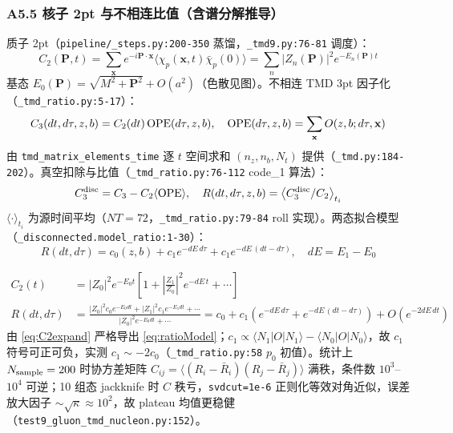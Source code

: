 \documentclass[UTF8]{ctexart}
\begin{document}
\subsubsection{A5.5 核子 2pt 与不相连比值（含谱分解推导）}
质子 2pt（\texttt{\nolinkurl{pipeline/\_steps.py:200-350}} 蒸馏，\texttt{\nolinkurl{\_tmd9.py:76-81}} 调度）：
\begin{equation}
C_2(\mathbf{P},t)=\sum_{\mathbf{x}}e^{-i\mathbf{P}\cdot\mathbf{x}}\langle\chi_p(\mathbf{x},t)\bar\chi_p(0)\rangle = \sum_n |Z_n(\mathbf{P})|^2 e^{-E_n(\mathbf{P})t}
\label{eq:C2spec}
\end{equation}
基态 $E_0(\mathbf{P})=\sqrt{M^2+\mathbf{P}^2}+O(a^2)$（色散见图）。不相连 TMD 3pt 因子化（\texttt{\nolinkurl{\_tmd\_ratio.py:5-17}}）：
\begin{equation}
C_3(dt,d\tau,z,b)=C_2(dt)\,{\rm OPE}(d\tau,z,b),\quad {\rm OPE}(d\tau,z,b)=\sum_{\mathbf{x}}O(z,b;d\tau,\mathbf{x})
\label{eq:C3fact}
\end{equation}
由 \texttt{\nolinkurl{tmd\_matrix\_elements\_time}} 逐 $t$ 空间求和 $(n_z,n_b,N_t)$ 提供（\texttt{\nolinkurl{\_tmd.py:184-202}}）。真空扣除与比值（\texttt{\nolinkurl{\_tmd\_ratio.py:76-112}} code\_1 算法）：
\begin{equation}
C_3^{\rm disc}=C_3-C_2\langle{\rm OPE}\rangle,\quad R(dt,d\tau,z,b)=\big\langle C_3^{\rm disc}/C_2\big\rangle_{t_i}
\label{eq:ratio}
\end{equation}
$\langle\cdot\rangle_{t_i}$ 为源时间平均（$NT=72$，\texttt{\nolinkurl{\_tmd\_ratio.py:79-84}} roll 实现）。两态拟合模型（\texttt{\nolinkurl{\_disconnected.model\_ratio:1-30}}）：
\begin{equation}
R(dt,d\tau)=c_0(z,b)+c_1 e^{-dE\,d\tau}+c_1 e^{-dE\,(dt-d\tau)},\quad dE=E_1-E_0
\label{eq:ratioModel}
\end{equation}

\begin{align}
C_2(t) &= |Z_0|^2 e^{-E_0 t}\left[1+ \left|\frac{Z_1}{Z_0}\right|^2 e^{-dE\,t}+ \cdots\right] \label{eq:C2expand}\\
R(dt,d\tau) &=\frac{|Z_0|^2 c_0 e^{-E_0 dt}+|Z_1|^2 c_1 e^{-E_1 dt}+\cdots}{|Z_0|^2 e^{-E_0 dt}+\cdots}
            =c_0 + c_1(e^{-dE\,d\tau}+e^{-dE\,(dt-d\tau)})+O(e^{-2dE\,dt}) \nonumber
\end{align}
由 \eqref{eq:C2expand} 严格导出 \eqref{eq:ratioModel}；$c_1\propto\langle N_1|O|N_1\rangle-\langle N_0|O|N_0\rangle$，故 $c_1$ 符号可正可负，实测 $c_1\sim-2c_0$（\texttt{\nolinkurl{\_tmd\_ratio.py:58}} $p_0$ 初值）。统计上 $N_{\rm sample}=200$ 时协方差矩阵 $C_{ij}=\langle(R_i-\bar R_i)(R_j-\bar R_j)\rangle$ 满秩，条件数 $10^3$--$10^4$ 可逆；10 组态 jackknife 时 $C$ 秩亏，\texttt{svdcut=1e-6} 正则化等效对角近似，误差放大因子 $\sim\sqrt{\kappa}\approx10^2$，故 plateau 均值更稳健（\texttt{\nolinkurl{test9\_gluon\_tmd\_nucleon.py:152}}）。
\end{document}
